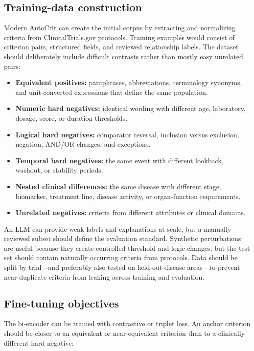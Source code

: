 \documentclass[11pt]{article}
\begin{document}
\subsection*{Training-data construction}

Modern AutoCrit can create the initial corpus by extracting and normalizing criteria from ClinicalTrials.gov protocols. Training examples would consist of criterion pairs, structured fields, and reviewed relationship labels. The dataset should deliberately include difficult contrasts rather than mostly easy unrelated pairs:

\begin{itemize}
    \item \textbf{Equivalent positives:} paraphrases, abbreviations, terminology synonyms, and unit-converted expressions that define the same population.
    \item \textbf{Numeric hard negatives:} identical wording with different age, laboratory, dosage, score, or duration thresholds.
    \item \textbf{Logical hard negatives:} comparator reversal, inclusion versus exclusion, negation, AND/OR changes, and exceptions.
    \item \textbf{Temporal hard negatives:} the same event with different lookback, washout, or stability periods.
    \item \textbf{Nested clinical differences:} the same disease with different stage, biomarker, treatment line, disease activity, or organ-function requirements.
    \item \textbf{Unrelated negatives:} criteria from different attributes or clinical domains.
\end{itemize}

An LLM can provide weak labels and explanations at scale, but a manually reviewed subset should define the evaluation standard. Synthetic perturbations are useful because they create controlled threshold and logic changes, but the test set should contain naturally occurring criteria from protocols. Data should be split by trial---and preferably also tested on held-out disease areas---to prevent near-duplicate criteria from leaking across training and evaluation.

\subsection*{Fine-tuning objectives}

The bi-encoder can be trained with contrastive or triplet loss. An anchor criterion should be closer to an equivalent or near-equivalent criterion than to a clinically different hard negative:
\end{document}
